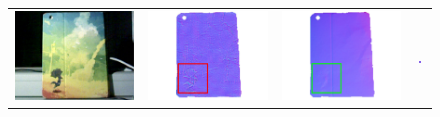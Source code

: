 \begin{figure}[!ht]
\centering
\setlength{\tabcolsep}{0.em} %
 {\renewcommand{\arraystretch}{5.5}%
\begin{tabular}{c|c c c}
   \includegraphics[height = 0.20\linewidth]{figures/result/robust_padback_rgb2.pdf} 
   &
   \includegraphics[height = 0.20\linewidth]{figures/result/rgbd_padback_normal_detail.pdf} &
   \includegraphics[height = 0.20\linewidth]{figures/result/robust_padback_normal_detail.pdf}&
   \includegraphics[width=0.16\textwidth]{figures/result/rgbd_padback_normal_crop.png}
   \\


\end{tabular}}
\end{figure}
